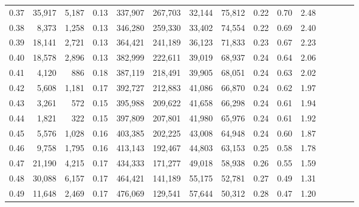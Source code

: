 \begin{tabular}{rrrcrrrrrrrrrrr}
0.37 &  35,917 &  5,187 &                                       0.13 &  337,907 &  267,703 &   32,144 &   75,812 &  0.22 &  0.70 &                         2.48 \\
0.38 &   8,373 &  1,258 &                                       0.13 &  346,280 &  259,330 &   33,402 &   74,554 &  0.22 &  0.69 &                         2.40 \\
0.39 &  18,141 &  2,721 &                                       0.13 &  364,421 &  241,189 &   36,123 &   71,833 &  0.23 &  0.67 &                         2.23 \\
0.40 &  18,578 &  2,896 &                                       0.13 &  382,999 &  222,611 &   39,019 &   68,937 &  0.24 &  0.64 &                         2.06 \\
0.41 &   4,120 &    886 &                                       0.18 &  387,119 &  218,491 &   39,905 &   68,051 &  0.24 &  0.63 &                         2.02 \\
0.42 &   5,608 &  1,181 &                                       0.17 &  392,727 &  212,883 &   41,086 &   66,870 &  0.24 &  0.62 &                         1.97 \\
0.43 &   3,261 &    572 &                                       0.15 &  395,988 &  209,622 &   41,658 &   66,298 &  0.24 &  0.61 &                         1.94 \\
0.44 &   1,821 &    322 &                                       0.15 &  397,809 &  207,801 &   41,980 &   65,976 &  0.24 &  0.61 &                         1.92 \\
0.45 &   5,576 &  1,028 &                                       0.16 &  403,385 &  202,225 &   43,008 &   64,948 &  0.24 &  0.60 &                         1.87 \\
0.46 &   9,758 &  1,795 &                                       0.16 &  413,143 &  192,467 &   44,803 &   63,153 &  0.25 &  0.58 &                         1.78 \\
0.47 &  21,190 &  4,215 &                                       0.17 &  434,333 &  171,277 &   49,018 &   58,938 &  0.26 &  0.55 &                         1.59 \\
0.48 &  30,088 &  6,157 &                                       0.17 &  464,421 &  141,189 &   55,175 &   52,781 &  0.27 &  0.49 &                         1.31 \\
0.49 &  11,648 &  2,469 &                                       0.17 &  476,069 &  129,541 &   57,644 &   50,312 &  0.28 &  0.47 &                         1.20 \\

\end{tabular}

